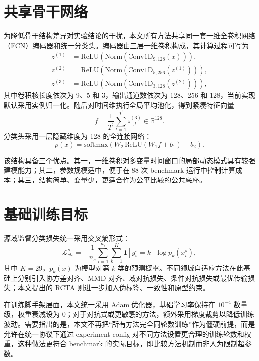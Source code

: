 \section{共享骨干网络}
为降低骨干结构差异对实验结论的干扰，本文所有方法共享同一套一维全卷积网络（FCN）编码器和统一分类头。编码器由三层一维卷积构成，其计算过程可写为
\begin{align}
z^{(1)} &= \mathrm{ReLU}(\mathrm{Norm}(\mathrm{Conv1D}_{9,128}(x))),\\
z^{(2)} &= \mathrm{ReLU}(\mathrm{Norm}(\mathrm{Conv1D}_{5,256}(z^{(1)}))),\\
z^{(3)} &= \mathrm{ReLU}(\mathrm{Norm}(\mathrm{Conv1D}_{3,128}(z^{(2)}))),
\end{align}
其中卷积核长度依次为 9、5 和 3，输出通道数依次为 128、256 和 128，当前实现默认采用实例归一化。随后对时间维执行全局平均池化，得到紧凑特征向量
\begin{equation}
f=\frac{1}{T^\prime}\sum_{t=1}^{T^\prime} z_{:,t}^{(3)}\in\mathbb{R}^{128}.
\end{equation}
分类头采用一层隐藏维度为 128 的全连接网络：
\begin{equation}
p(x)=\mathrm{softmax}(W_2\,\mathrm{ReLU}(W_1 f+b_1)+b_2).
\end{equation}

该结构具备三个优点。其一，一维卷积对多变量时间窗口的局部动态模式具有较强建模能力；其二，参数规模适中，便于在 88 次 benchmark 运行中控制计算成本；其三，结构简单、变量少，更适合作为公平比较的公共底座。

\section{基础训练目标}
源域监督分类损失统一采用交叉熵形式：
\begin{equation}
\mathcal{L}_{cls}^{s}=
-\frac{1}{n_s}\sum_{i=1}^{n_s}\sum_{k=1}^{K}
\mathbf{1}[y_i^s=k]\log p_k(x_i^s),
\end{equation}
其中 $K=29$，$p_k(x)$ 为模型对第 $k$ 类的预测概率。不同领域自适应方法在此基础上分别引入协方差对齐、MMD 对齐、域对抗损失、条件对抗损失或最优传输损失；本文提出的 RCTA 则进一步加入伪标签、一致性和原型约束。

在训练脚手架层面，本文统一采用 Adam 优化器，基础学习率保持在 $10^{-4}$ 数量级，权重衰减设为 0；对于对抗式或更敏感的方法，额外采用梯度裁剪以降低训练波动。需要指出的是，本文不再把“所有方法完全同轮数训练”作为僵硬前提，而是允许在统一协议下通过 experiment config 对不同方法设置更合理的训练轮数和权重，这种做法更符合 benchmark 的实际目标，即比较方法机制而非人为限制超参数。

